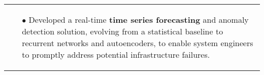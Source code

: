\documentclass[11pt,a4paper,sans,english]{moderncv}
\makeatletter
\newcommand*{\mycvitem}[2][.25em]{%
	\vspace{-.25em}
	\begin{tabular}{@{}p{\textwidth}@{}}%
		\small#2%
	\end{tabular}%
	\par\addvspace{-0.7em}  %
}
\newcommand*{\cvtag}[1]{%
	\textcolor{lightgray!50!black}{\fbox{\mathstrut\scriptsize\textsf{\textbf{#1}}}}%
}
\makeatother
\begin{document}
\mycvitem{
\vspace*{-.6cm}
\begin{flushleft}
	\noindent
	\cvtag{Python} \cvtag{Tensorflow} \cvtag{Google Cloud Platform} \cvtag{Flask} \cvtag{Bokeh} \cvtag{Bash}
\end{flushleft}
\vspace*{-.2cm}
\begin{itemize}
	\item[$\bullet$] Developed a real-time \textbf{time series forecasting} and anomaly detection solution, evolving from a statistical baseline to recurrent networks and autoencoders, to enable system engineers to promptly address potential infrastructure failures.
\end{itemize}}

\vspace*{-.2cm}
\end{document}
